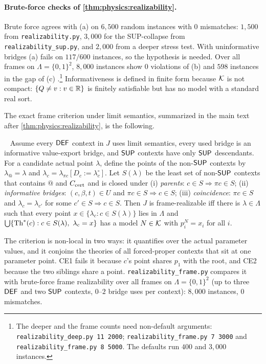 \paragraph{Brute-force checks of \cref{thm:physics:realizability}.} Brute force agrees with
(a) on $6{,}500$ random instances with $0$ mismatches: $1{,}500$ from
\texttt{realizability.py}, $3{,}000$ for the SUP-collapse from
\texttt{realizability\_sup.py}, and $2{,}000$ from a deeper stress test. With uninformative
bridges (a) fails on $117/600$ instances, so the hypothesis is needed. Over all frames on
$\Lambda=\{0,1\}^2$, $8{,}000$ instances show $0$ violations of (b) and $598$ instances in
the gap of (c) .\footnote{The deeper and the frame counts need non-default
arguments: \texttt{realizability\_deep.py 11 2000}; \texttt{realizability\_frame.py 7 3000}
and \texttt{realizability\_frame.py 8 5000}. The defaults run $400$ and $3{,}000$
instances.} Informativeness is defined in finite form because $\mathcal{K}$ is not compact:
$\{Q\neq v:v\in\mathbb{R}\}$ is finitely satisfiable but has no model with a standard real sort.

The exact frame criterion under limit semantics, summarized in the main text after
\cref{thm:physics:realizability}, is the following.

\begin{proposition}\ \label{prop:physics:framerealizability}
Assume every $\mathsf{DEF}$ context in $J$ uses limit semantics, every used bridge is an informative
value-export bridge, and $\mathsf{SUP}$ contexts have only $\mathsf{SUP}$ descendants. For a candidate actual
point $\lambda$, define the points of the non-$\mathsf{SUP}$ contexts by $\lambda_@=\lambda$ and
$\lambda_c=\lambda_{\pi c}[D_c{:=}\lambda^\circ_c]$. Let $S(\lambda)$ be the least set of
non-$\mathsf{SUP}$ contexts that contains $@$ and $C_{\mathrm{cert}}$ and is closed under (i) \emph{parents}:
$c\in S\Rightarrow\pi c\in S$; (ii) \emph{informative bridges}: $(c,\beta,t)\in U$ and
$\pi c\in S\Rightarrow c\in S$; (iii) \emph{coincidence}: $\pi c\in S$ and
$\lambda_c=\lambda_{c'}$ for some $c'\in S\Rightarrow c\in S$. Then $J$ is frame-realizable iff
there is $\lambda\in\Lambda$ such that every point $x\in\{\lambda_c:c\in S(\lambda)\}$ lies in
$\Lambda$ and $\bigcup\{\Th^*(c):c\in S(\lambda),\ \lambda_c=x\}$ has a model $N\in\mathcal{K}$ with
$p_i^N=x_i$ for all $i$.
\end{proposition}

The criterion is non-local in two ways: it quantifies over the actual parameter values, and
it conjoins the theories of all forced-proper contexts that sit at one parameter point. CE1
fails it because $c$'s point shares $p_1$ with the root, and CE2 because the two siblings
share a point. \texttt{realizability\_frame.py} compares it with brute-force frame
realizability over all frames on $\Lambda=\{0,1\}^2$ (up to three $\mathsf{DEF}$ and two $\mathsf{SUP}$
contexts, $0$--$2$ bridge uses per context): $8{,}000$ instances, $0$ mismatches.

